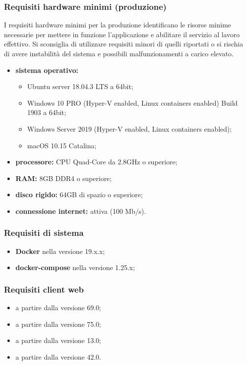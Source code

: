 	\subsubsection{Requisiti hardware minimi (produzione)}
	I requisiti hardware minimi per la produzione identificano le risorse minime necessarie per mettere in funzione l'applicazione e abilitare il servizio al lavoro effettivo. Si sconsiglia di utilizzare requisiti minori di quelli riportati o si rischia di avere instabilità del sistema e possibili malfunzionamenti a carico elevato.
		\begin{itemize}
			\item \textbf{sistema operativo:} 
			\begin{itemize}
				\item Ubuntu server 18.04.3 LTS a 64bit;
				\item Windows 10 PRO (Hyper-V enabled, Linux containers enabled) Build 1903 a 64bit; 
				\item Windows Server 2019 (Hyper-V enabled, Linux containers enabled);
				\item macOS 10.15 Catalina;
			\end{itemize}
			\item \textbf{processore:} CPU Quad-Core da 2.8GHz o superiore;
			\item \textbf{RAM:} 8GB DDR4 o superiore;
			\item \textbf{disco rigido:} 64GB di spazio o superiore;
			\item \textbf{connessione internet:} attiva (100 Mb/s).
		\end{itemize}
	\subsubsection{Requisiti di sistema}
		\begin{itemize}
			\item \textbf{Docker} nella versione 19.x.x;
			\item \textbf{docker-compose} nella versione 1.25.x;
		\end{itemize}
	\subsubsection{Requisiti client web}
		\begin{itemize}
		 	\item {} a partire dalla versione 69.0;
		 	\item {} a partire dalla versione 75.0;
		 	\item {} a partire dalla versione 13.0;
		 	\item {} a partire dalla versione 42.0.
		\end{itemize} 
